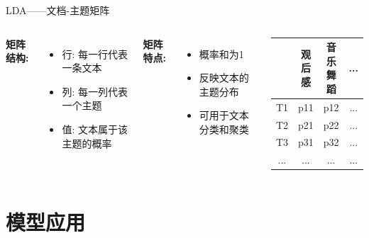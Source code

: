 \documentclass{beamer}
\begin{document}
\begin{frame}{LDA——文档-主题矩阵}
    \begin{columns}
        \textbf{矩阵结构:}
        \begin{itemize}
            \item 行: 每一行代表一条文本
            \item 列: 每一列代表一个主题
            \item 值: 文本属于该主题的概率
        \end{itemize}
        \vspace{0.3cm}
        \textbf{矩阵特点:}
        \begin{itemize}
            \item 概率和为1
            \item 反映文本的主题分布
            \item 可用于文本分类和聚类
        \end{itemize}

        \begin{center}
            \begin{tabular}{cccc}
                \hline
                 & 观后感 & 音乐舞蹈 & ... \\
                \hline
                T1 & p11 & p12 & ... \\
                T2 & p21 & p22 & ... \\
                T3 & p31 & p32 & ... \\
                ... & ... & ... & ... \\
                \hline
            \end{tabular}
        \end{center}
    \end{columns}
\end{frame}


\section{模型应用}
\end{document}
